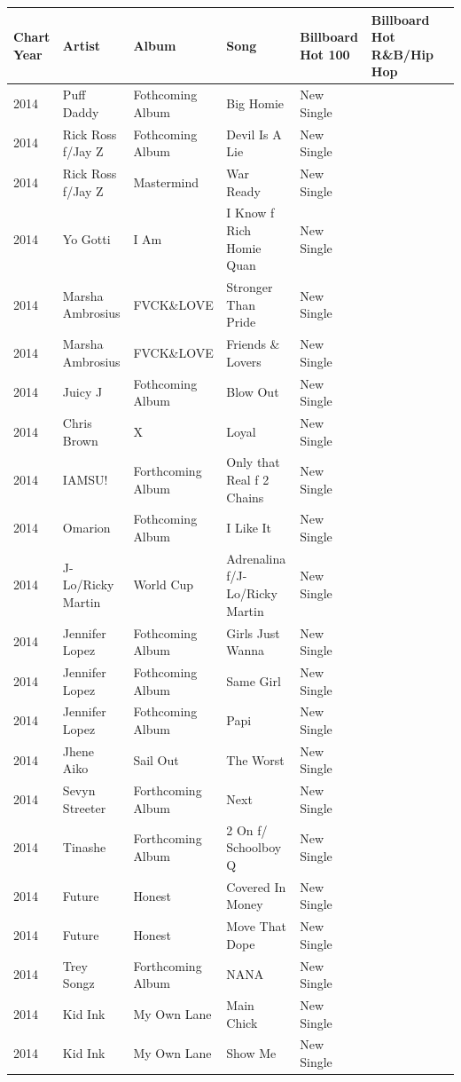 \documentclass{article}
\begin{document}
\begin{tabular}{lllllll}
\toprule
Chart Year & Artist & Album & Song & Billboard Hot 100 & Billboard Hot R\&B/Hip Hop &  \\
\midrule
2014 & Puff Daddy & Fothcoming Album & Big Homie & New Single &  &  \\
2014 & Rick Ross f/Jay Z & Fothcoming Album & Devil Is A Lie & New Single &  &  \\
2014 & Rick Ross f/Jay Z & Mastermind & War Ready & New Single &  &  \\
2014 & Yo Gotti & I Am & I Know f Rich Homie Quan & New Single &  &  \\
2014 & Marsha Ambrosius & FVCK\&LOVE & Stronger Than Pride & New Single &  &  \\
2014 & Marsha Ambrosius & FVCK\&LOVE & Friends \& Lovers & New Single &  &  \\
2014 & Juicy J & Fothcoming Album & Blow Out & New Single &  &  \\
2014 & Chris Brown & X & Loyal & New Single &  &  \\
2014 & IAMSU! & Forthcoming Album & Only that Real f 2 Chains & New Single &  &  \\
2014 & Omarion & Fothcoming Album & I Like It & New Single &  &  \\
2014 & J-Lo/Ricky Martin & World Cup & Adrenalina f/J-Lo/Ricky Martin & New Single &  &  \\
2014 & Jennifer Lopez & Fothcoming Album & Girls Just Wanna & New Single &  &  \\
2014 & Jennifer Lopez & Fothcoming Album & Same Girl & New Single &  &  \\
2014 & Jennifer Lopez & Fothcoming Album & Papi & New Single &  &  \\
2014 & Jhene Aiko & Sail Out & The Worst & New Single &  &  \\
2014 & Sevyn Streeter & Forthcoming Album & Next & New Single &  &  \\
2014 & Tinashe & Forthcoming Album & 2 On f/ Schoolboy Q & New Single &  &  \\
2014 & Future & Honest & Covered In Money & New Single &  &  \\
2014 & Future & Honest & Move That Dope & New Single &  &  \\
2014 & Trey Songz & Forthcoming Album & NANA & New Single &  &  \\
2014 & Kid Ink & My Own Lane & Main Chick & New Single &  &  \\
2014 & Kid Ink & My Own Lane & Show Me & New Single &  &  \\

\end{tabular}
\end{document}
